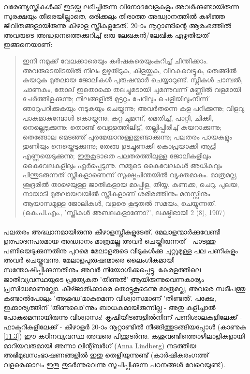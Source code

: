 വരേണ്യസ്ത്രീകൾക്ക് ഇടയ്ക്കു ലഭിച്ചിരുന്ന വിനോദവേളകളും അവർക്കുണ്ടായിരുന്ന സുരക്ഷയും തീരെയില്ലാതെ, ഒരിക്കലും തീരാത്ത അദ്ധ്വാനത്തിൽ കഴിഞ്ഞ ജീവിതങ്ങളായിരുന്നു കീഴാള സ്ത്രീകളുടേത്. 20-ാം നൂറ്റാണ്ടിന്റെ ആരംഭത്തിൽ അവരുടെ അദ്ധ്വാനത്തെക്കുറിച്ച് ഒരു ലേഖകൻ/ലേഖിക എഴുതിയത് ഇങ്ങനെയാണ്:
\begin{quotation}
ഇനി നമുക്ക് വേലക്കാരെയും കർഷകരെയുംകുറിച്ച് ചിന്തിക്കാം. അവരുടെയിടയിൽ നിലം ഉഴുതിടുക, കിളയ്ക്കുക, വിറകുവെട്ടുക, തെങ്ങിൽ കയറുക മുതലായ ജോലികൾ പുരുഷന്മാർ ചെയ്യാറുണ്ട്. സ്ത്രീകൾ ചാമ്പൽ, ചാണകം, തോല് ഇതൊക്കെ തലച്ചുമടായി ചുമന്നുവന്ന് മണ്ണിൽ വളമായി ചേർത്തിളക്കുന്നു; നിലങ്ങളിൽ മുട്ടറ്റം ചേറിലും ചെളിയിലുംനിന്ന് ഞാറുപറിക്കുകയും നടുകയും ചെയ്യുന്നു; അവർതന്നെ കള പറിക്കുന്നു; വിളവു പാകമാകുമ്പോൾ കൊയ്യുന്നു; കറ്റ ചുമന്ന്, മെതിച്ച്, പാറ്റി, ചിക്കി, നെല്ലെടുക്കുന്നു; തൊണ്ട് വെള്ളത്തിലിട്ട്, തല്ലിപ്പിരിച്ച് കയറാക്കുന്നു; തെങ്ങോല മെടഞ്ഞ് പുരമേയാനുള്ളതുണ്ടാക്കുന്നു; പലതരം പായകളും തുണിയും നെയ്തെടുക്കുന്നു; തേങ്ങ ഉടച്ചുണക്കി കൊപ്രയാക്കി ആട്ടി എണ്ണയെടുക്കുന്നു; ഇതുകൂടാതെ പലതരത്തിലുള്ള ജോലികളിലും കൈവേലകളിലും ഏർപ്പെടുന്നു. നമ്മുടെ കൈവേലകൾ അധികവും പിന്തുടരുന്നത് സ്ത്രീകളാണെന്ന് സൂക്ഷ്മചിന്തയിൽ വ്യക്തമാകും. മാത്രമല്ല, ശൂദ്രരിൽ താഴെയുള്ള ജാതികളായ മാപ്പിള, തീയ്യ, കണക്ക, ചെറു, പുലയ, നായാടി മുതലായവയിൽ സ്ത്രീകളാണ് ശരീരത്തിനും മനസ്സിനും ആയാസമുള്ള ജോലികൾ, വളരെ കൂടുതൽ സമയം, ചെയ്യുന്നത്.
(കെ.പി.എം., 'സ്ത്രീകൾ അബലകളാണോ?', ലക്ഷ്മീഭായി 2 (8), 1907)
\end{quotation}

\paragraph{} പലതരം അദ്ധ്വാനമായിരുന്നു കീഴാളസ്ത്രീകളുടേത്. മേലാളന്മാർക്കുവേണ്ടി ഉത്പാദനപരമായ അദ്ധ്വാനം മാത്രമല്ല അവർ ചെയ്തിരുന്നത് - പാടത്തു പണിയെടുക്കുന്നതിനു പുറമെ മേലാളരുടെ വീടുകൾക്കു ചുറ്റുമുള്ള പല പണികളും അവർ ചെയ്തുവന്നു. മേലാളപുരുഷന്മാരെ ലൈംഗികമായി സന്തോഷിപ്പിക്കുന്നതിനും അവർ നിയോഗിക്കപ്പെട്ടു. കേരളത്തിലെ ജാതിവ്യവസ്ഥയുടെ പ്രത്യേകത 'തീണ്ടൽ' ആയിരുന്നുവെന്നകാര്യം പ്രസിദ്ധമാണല്ലോ. കീഴ്ജാതിക്കാരെ തൊട്ടുകൂടെന്നു മാത്രമല്ല, അവരെ സമീപത്തു കണ്ടാൽപോലും 'അശുദ്ധ'മാകുമെന്ന വിശ്വാസമാണ് 'തീണ്ടൽ'. പക്ഷേ, ഇക്കാര്യത്തിന് 'തീണ്ടലൊ'ന്നും ബാധകമായിരുന്നില്ല - അതു കുളിച്ചാൽ പോകുമെന്നായിരുന്നു വിശ്വാസം! കൃഷിയിടങ്ങളിൽനിന്ന് പണിശാലകളിലേക്ക് - ഫാക്ടറികളിലേക്ക് - കീഴാളർ 20-ാം നൂറ്റാണ്ടിൽ നീങ്ങിത്തുടങ്ങിയപ്പോൾ (കാണുക \ref{11.3}) ഈ കഠിനവ്യവസ്ഥ അവരെ പിന്തുടർന്നു. കശുവണ്ടിത്തൊഴിലാളികളായി മാറിയവരുമായി അന്നാ ലിന്റ്ബർഗ് (Anna Lindberg) നടത്തിയ അഭിമുഖസംഭാഷണങ്ങളിൽ ഇതു തെളിയുന്നുണ്ട് (കാർഷികരംഗത്ത് വളരെക്കാലം ഇതു തുടർന്നുവെന്നു സൂചിപ്പിക്കുന്ന പഠനങ്ങൾ വേറെയുണ്ട്).
